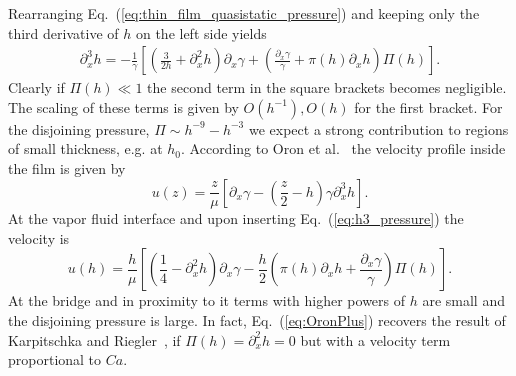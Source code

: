 \documentclass[twocolumn,amsmath,amssymb,showpacs,pre,nofootinbib,superscriptaddress]{revtex4-1} %
\begin{document}
Rearranging Eq.~(\ref{eq:thin_film_quasistatic_pressure}) and keeping only the third derivative of $h$ on the left side yields
\begin{align}\label{eq:h3_pressure}
    \partial_x^3 h = -\frac{1}{\gamma}\left[\left(\frac{3}{2 h} + \partial_x^2 h \right)\partial_x\gamma 
    + \left(\frac{\partial_x\gamma}{\gamma}+\pi(h)\partial_x h\right)\Pi(h)\right].
\end{align}
Clearly if $\Pi(h)\ll 1$ the second term in the square brackets becomes negligible.
The scaling of these terms is given by $O(h^{-1}),O(h)$ for the first bracket.
For the disjoining pressure, $\Pi\sim h^{-9}-h^{-3}$ we expect a strong contribution to regions of small thickness, e.g. at $h_0$.
According to Oron et al.~\cite{RevModPhys.69.931} the velocity profile inside the film is given by
\begin{equation}\label{eq:Oron_vel}
    u(z) = \frac{z}{\mu}\left[\partial_x\gamma - \left(\frac{z}{2} - h\right)\gamma\partial_x^3 h\right].
\end{equation}
At the vapor fluid interface and upon inserting Eq.~(\ref{eq:h3_pressure}) the velocity is
\begin{equation}\label{eq:OronPlus}
     u(h) = \frac{h}{\mu}\left[\left(\frac{1}{4}-\partial_x^2 h\right)\partial_x\gamma - \frac{h}{2}\left( \pi(h)\partial_x h + \frac{\partial_x\gamma}{\gamma}\right)\Pi(h)\right].
\end{equation}
At the bridge and in proximity to it terms with higher powers of $h$ are small and the disjoining pressure is large.
In fact, Eq.~(\ref{eq:OronPlus}) recovers the result of Karpitschka and Riegler~\cite{PhysRevLett.109.066103}, if $\Pi(h) = \partial_x^2h = 0$ but with a velocity term proportional to $Ca$.
\end{document}
